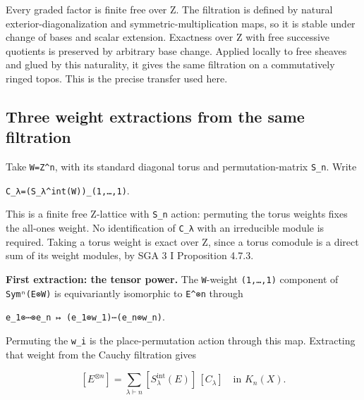\documentclass[
  10pt,
]{article}
\begin{document}
Every graded factor is finite free over Z. The filtration is defined by
natural exterior-diagonalization and symmetric-multiplication maps, so
it is stable under change of bases and scalar extension. Exactness over
Z with free successive quotients is preserved by arbitrary base change.
Applied locally to free sheaves and glued by this naturality, it gives
the same filtration on a commutatively ringed topos. This is the precise
transfer used here.

\subsection{Three weight extractions from the same
filtration}\label{three-weight-extractions-from-the-same-filtration}

Take \texttt{\small W=\allowbreak{}Z\textasciicircum{}n}, with its
standard diagonal torus and permutation-matrix
\texttt{\small S\_\allowbreak{}n}. Write

\texttt{\small C\_\allowbreak{}λ=\allowbreak{}(\allowbreak{}S\_\allowbreak{}λ\textasciicircum{}int(\allowbreak{}W)\allowbreak{})\allowbreak{}\_\allowbreak{}(\allowbreak{}1,\allowbreak{}…,\allowbreak{}1)\allowbreak{}}.

This is a finite free Z-lattice with \texttt{\small S\_\allowbreak{}n}
action: permuting the torus weights fixes the all-ones weight. No
identification of \texttt{\small C\_\allowbreak{}λ} with an irreducible
module is required. Taking a torus weight is exact over Z, since a torus
comodule is a direct sum of its weight modules, by SGA 3 I Proposition
4.7.3.

\textbf{First extraction: the tensor power.} The
\texttt{\small W}-weight
\texttt{\small (\allowbreak{}1,\allowbreak{}…,\allowbreak{}1)\allowbreak{}}
component of
\texttt{\small Symⁿ(\allowbreak{}E⊗\allowbreak{}W)\allowbreak{}} is
equivariantly isomorphic to
\texttt{\small E\textasciicircum{}⊗\allowbreak{}n} through

\texttt{\small e\_\allowbreak{}1⊗\allowbreak{}⋯⊗\allowbreak{}e\_\allowbreak{}n ↦ (\allowbreak{}e\_\allowbreak{}1⊗\allowbreak{}w\_\allowbreak{}1)\allowbreak{}⋯(\allowbreak{}e\_\allowbreak{}n⊗\allowbreak{}w\_\allowbreak{}n)\allowbreak{}}.

Permuting the \texttt{\small w\_\allowbreak{}i} is the place-permutation
action through this map. Extracting that weight from the Cauchy
filtration gives

\[
[E^{\otimes n}]=\sum_{\lambda\vdash n}[S_\lambda^{\mathrm{int}}(E)]\,[C_\lambda]
\quad\text{in }K_n(X).
\tag{A12.2}
\]
\end{document}

